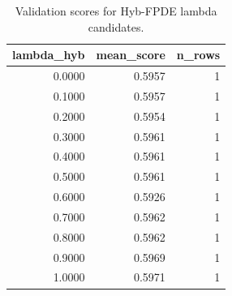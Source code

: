 \begin{table}[t]
\caption{Validation scores for Hyb-FPDE lambda candidates.}
\label{tab:lambda_distribution_computed}
\centering
\begin{tabular}{rrr}
\toprule
lambda\_hyb & mean\_score & n\_rows \\
\midrule
0.0000 & 0.5957 & 1 \\
0.1000 & 0.5957 & 1 \\
0.2000 & 0.5954 & 1 \\
0.3000 & 0.5961 & 1 \\
0.4000 & 0.5961 & 1 \\
0.5000 & 0.5961 & 1 \\
0.6000 & 0.5926 & 1 \\
0.7000 & 0.5962 & 1 \\
0.8000 & 0.5962 & 1 \\
0.9000 & 0.5969 & 1 \\
1.0000 & 0.5971 & 1 \\
\bottomrule
\end{tabular}

\end{table}
